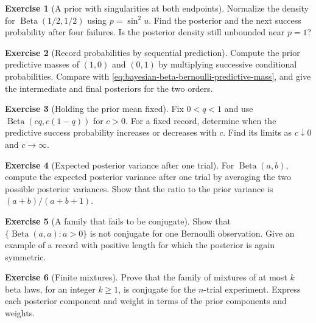 \documentclass[11pt,oneside]{book}
\theoremstyle{definition}
\newtheorem{exercise}{Exercise}[section]
\theoremstyle{remark}
\begin{document}
\begin{exercise}[A prior with singularities at both endpoints]
\label{exer:bayesian-beta-half-parameters}
Normalize the density for $\operatorname{Beta}(1/2,1/2)$ using
$p=\sin^2 u$. Find the posterior and the next success probability
after four failures. Is the posterior density still unbounded
near $p=1$?
\end{exercise}

\begin{exercise}[Record probabilities by sequential prediction]
\label{exer:bayesian-beta-sequential-record}
Compute the prior predictive masses of $(1,0)$ and $(0,1)$ by
multiplying successive conditional probabilities. Compare with
\eqref{eq:bayesian-beta-bernoulli-predictive-mass}, and give the
intermediate and final posteriors for the two orders.
\end{exercise}

\begin{exercise}[Holding the prior mean fixed]
\label{exer:bayesian-beta-predictive-weight}
Fix $0<q<1$ and use $\operatorname{Beta}(cq,c(1-q))$ for $c>0$.
For a fixed record, determine when the predictive success
probability increases or decreases with $c$. Find its limits
as $c\downarrow0$ and $c\to\infty$.
\end{exercise}

\begin{exercise}[Expected posterior variance after one trial]
\label{exer:bayesian-beta-expected-variance}
For $\operatorname{Beta}(a,b)$, compute the expected posterior
variance after one trial by averaging the two possible posterior
variances. Show that the ratio to the prior variance is
$(a+b)/(a+b+1)$.
\end{exercise}

\begin{exercise}[A family that fails to be conjugate]
\label{exer:bayesian-beta-symmetric-nonconjugate}
Show that $\{\operatorname{Beta}(a,a):a>0\}$ is not conjugate for
one Bernoulli observation. Give an example of a record with
positive length for which the posterior is again symmetric.
\end{exercise}

\begin{exercise}[Finite mixtures]
\label{exer:bayesian-beta-finite-mixtures}
Prove that the family of mixtures of at most $k$ beta laws,
for an integer $k\geq1$, is conjugate for the $n$-trial experiment.
Express each posterior component and weight in terms of the prior
components and weights.
\end{exercise}
\end{document}
